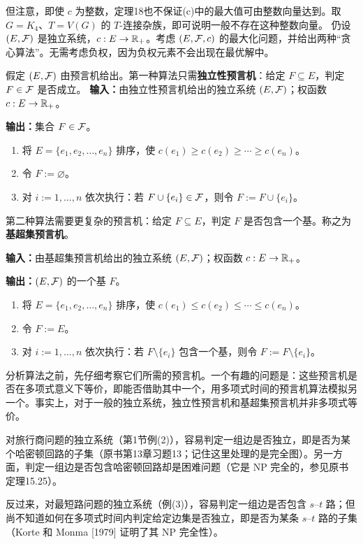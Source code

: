 但注意，即使 $c$ 为整数，定理18也不保证(c)中的最大值可由整数向量达到。取 $G=K_4$、$T=V(G)$ 的 $T$-连接杂族，即可说明一般不存在这种整数向量。
仍设 $(E,\mathcal F)$ 是独立系统，$c:E\to\mathbb R_+$。考虑 $(E,\mathcal F,c)$ 的最大化问题，并给出两种“贪心算法”。无需考虑负权，因为负权元素不会出现在最优解中。

假定 $(E,\mathcal F)$ 由预言机给出。第一种算法只需\textbf{独立性预言机}：给定 $F\subseteq E$，判定 $F\in\mathcal F$ 是否成立。
\textbf{输入：}由独立性预言机给出的独立系统 $(E,\mathcal F)$；权函数 $c:E\to\mathbb R_+$。\par
\textbf{输出：}集合 $F\in\mathcal F$。
\begin{enumerate}[label=\arabic*.]
\item 将 $E=\{e_1,e_2,\ldots,e_n\}$ 排序，使 $c(e_1)\ge c(e_2)\ge\cdots\ge c(e_n)$。
\item 令 $F:=\varnothing$。
\item 对 $i:=1,\ldots,n$ 依次执行：若 $F\cup\{e_i\}\in\mathcal F$，则令 $F:=F\cup\{e_i\}$。
\end{enumerate}
第二种算法需要更复杂的预言机：给定 $F\subseteq E$，判定 $F$ 是否包含一个基。称之为\textbf{基超集预言机}。

\textbf{输入：}由基超集预言机给出的独立系统 $(E,\mathcal F)$；权函数 $c:E\to\mathbb R_+$。\par
\textbf{输出：}$(E,\mathcal F)$ 的一个基 $F$。
\begin{enumerate}[label=\arabic*.]
\item 将 $E=\{e_1,e_2,\ldots,e_n\}$ 排序，使 $c(e_1)\le c(e_2)\le\cdots\le c(e_n)$。
\item 令 $F:=E$。
\item 对 $i:=1,\ldots,n$ 依次执行：若 $F\setminus\{e_i\}$ 包含一个基，则令 $F:=F\setminus\{e_i\}$。
\end{enumerate}
分析算法之前，先仔细考察它们所需的预言机。一个有趣的问题是：这些预言机是否在多项式意义下等价，即能否借助其中一个，用多项式时间的预言机算法模拟另一个。事实上，对于一般的独立系统，独立性预言机和基超集预言机并非多项式等价。

对旅行商问题的独立系统（第1节例(2)），容易判定一组边是否独立，即是否为某个哈密顿回路的子集（原书第13章习题13；记住这里处理的是完全图）。另一方面，判定一组边是否包含哈密顿回路却是困难问题（它是 NP 完全的，参见原书定理15.25）。

反过来，对最短路问题的独立系统（例(3)），容易判定一组边是否包含 $s$--$t$ 路；但尚不知道如何在多项式时间内判定给定边集是否独立，即是否为某条 $s$--$t$ 路的子集（Korte 和 Monma [1979] 证明了其 NP 完全性）。

